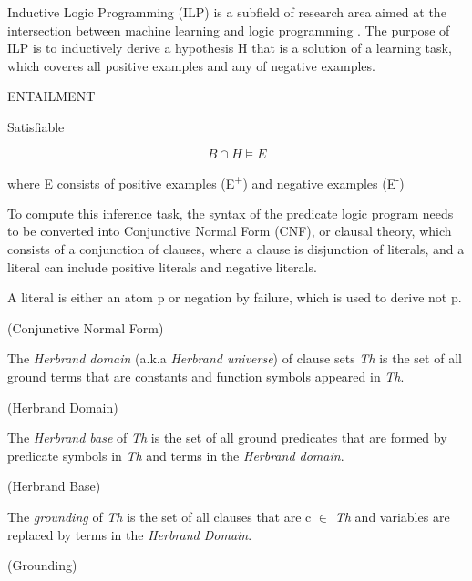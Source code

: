 \documentclass[12pt,twoside]{report}
\begin{document}
\label{ilp}
Inductive Logic Programming (ILP) is a subfield of research area aimed at the intersection between machine learning and logic programming \cite{Muggleton1991}. The purpose of ILP is to inductively derive a hypothesis H that is a solution of a learning task, which coveres all positive examples and any of negative examples.

ENTAILMENT

Satisfiable

\begin{equation}
B \cap H \models E
\end{equation}

where E consists of positive examples (E\textsuperscript{+}) and negative examples (E\textsuperscript{-})

To compute this inference task, the syntax of the predicate logic program needs to be converted into Conjunctive Normal Form (CNF), or clausal theory, which consists of a conjunction of clauses, where a clause is disjunction of literals, and a literal can include positive literals and negative literals.

A literal is either an atom p or negation by failure, which is used to derive not p.

\begin{examp} (Conjunctive Normal Form)

\end{examp}


The \textit{Herbrand domain} (a.k.a \textit{Herbrand universe}) of clause sets \textit{Th} is the set of all ground terms that are constants and function symbols appeared in \textit{Th}.

\begin{examp} (Herbrand Domain)

\end{examp}

The \textit{Herbrand base} of \textit{Th} is the set of all ground predicates that are formed by predicate symbols in \textit{Th} and terms in the \textit{Herbrand domain}.

\begin{examp} (Herbrand Base)

\end{examp}

The \textit{grounding} of \textit{Th} is the set of all clauses that are c $\in$ \textit{Th} and variables are replaced by terms in the \textit{Herbrand Domain}.

\begin{examp} (Grounding)

\end{examp}
\end{document}
